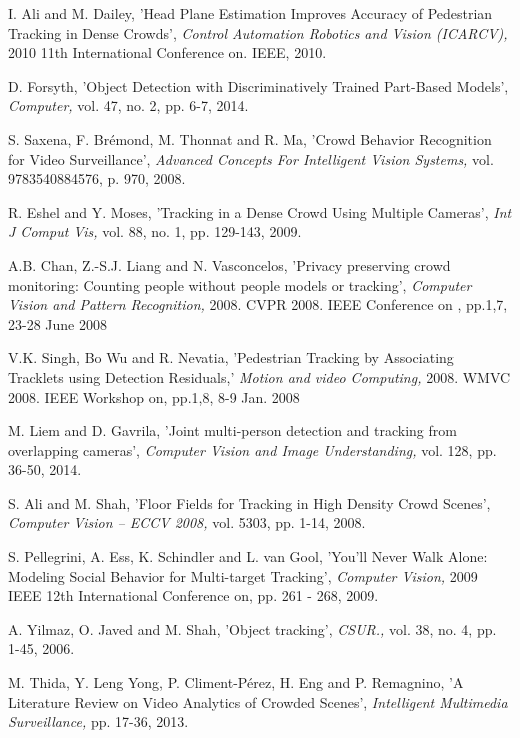 \documentclass[conference]{IEEEtran}
\begin{document}
\begin{thebibliography}{1}
I. Ali and M. Dailey, 'Head Plane Estimation Improves Accuracy of Pedestrian Tracking in Dense Crowds', \textit{Control Automation Robotics and Vision (ICARCV),} 2010 11th International Conference on. IEEE, 2010.

D. Forsyth, 'Object Detection with Discriminatively Trained Part-Based Models', \textit{Computer,} vol. 47, no. 2, pp. 6-7, 2014.

S. Saxena, F. Brémond, M. Thonnat and R. Ma, 'Crowd Behavior Recognition for Video Surveillance', \textit{Advanced Concepts For Intelligent Vision Systems,} vol. 9783540884576, p. 970, 2008.

R. Eshel and Y. Moses, 'Tracking in a Dense Crowd Using Multiple Cameras', \textit{Int J Comput Vis,} vol. 88, no. 1, pp. 129-143, 2009.

A.B. Chan, Z.-S.J. Liang and N. Vasconcelos, 'Privacy preserving crowd monitoring: Counting people without people models or tracking', \textit{Computer Vision and Pattern Recognition,} 2008. CVPR 2008. IEEE Conference on , pp.1,7, 23-28 June 2008

V.K. Singh, Bo Wu and R. Nevatia, 'Pedestrian Tracking by Associating Tracklets using Detection Residuals,' \textit{Motion and video Computing,} 2008. WMVC 2008. IEEE Workshop on, pp.1,8, 8-9 Jan. 2008

M. Liem and D. Gavrila, 'Joint multi-person detection and tracking from overlapping cameras', \textit{Computer Vision and Image Understanding,} vol. 128, pp. 36-50, 2014.

S. Ali and M. Shah, 'Floor Fields for Tracking in High Density Crowd Scenes', \textit{Computer Vision – ECCV 2008,} vol. 5303, pp. 1-14, 2008.

S. Pellegrini, A. Ess, K. Schindler and L. van Gool, 'You’ll Never Walk Alone: Modeling Social Behavior for Multi-target Tracking', \textit{Computer Vision,} 2009 IEEE 12th International Conference on, pp. 261 - 268, 2009.

A. Yilmaz, O. Javed and M. Shah, 'Object tracking', \textit{CSUR.,} vol. 38, no. 4, pp. 1-45, 2006.

M. Thida, Y. Leng Yong, P. Climent-Pérez, H. Eng and P. Remagnino, 'A Literature Review on Video Analytics of Crowded Scenes', \textit{Intelligent Multimedia Surveillance,} pp. 17-36, 2013.


\end{thebibliography}
\end{document}
